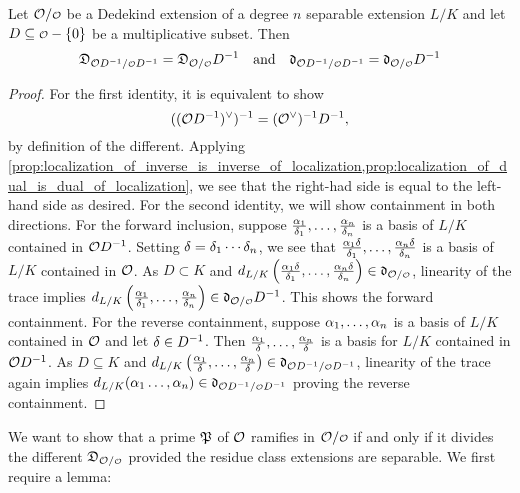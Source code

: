     \begin{proposition}\label{prop:different_and_discriminant_respect_localization}
      Let $\mc{O}/\smc{O}$ be a Dedekind extension of a degree $n$ separable extension $L/K$ and let $D \subseteq \smc{O}-\{0\}$ be a multiplicative subset. Then
      \[
        \mf{D}_{\mc{O}D^{-1}/\smc{O}D^{-1}} = \mf{D}_{\mc{O}/\smc{O}}D^{-1} \quad \text{and} \quad \mf{d}_{\mc{O}D^{-1}/\smc{O}D^{-1}} = \mf{d}_{\mc{O}/\smc{O}}D^{-1}
      \]
    \end{proposition}
    \begin{proof}
      For the first identity, it is equivalent to show
      \[
        ((\mathcal{O}D^{-1})^{\vee})^{-1} = (\mathcal{O}^{\vee})^{-1}D^{-1},
      \]
      by definition of the different. Applying \cref{prop:localization_of_inverse_is_inverse_of_localization,prop:localization_of_dual_is_dual_of_localization}, we see that the right-had side is equal to the left-hand side as desired. For the second identity, we will show containment in both directions. For the forward inclusion, suppose $\frac{\alpha_{1}}{\delta_{1}},\ldots,\frac{\alpha_{n}}{\delta_{n}}$ is a basis of $L/K$ contained in $\mathcal{O}D^{-1}$. Setting $\delta = \delta_{1} \cdots \delta_{n}$, we see that $\frac{\alpha_{1}\delta}{\delta_{1}},\ldots,\frac{\alpha_{n}\delta}{\delta_{n}}$ is a basis of $L/K$ contained in $\mathcal{O}$. As $D \subset K$ and $d_{L/K}\left(\frac{\a_{1}\d}{\d_{1}},\ldots,\frac{\a_{n}\d}{\d_{n}}\right) \in \mf{d}_{\mc{O}/\smc{O}}$, linearity of the trace implies $d_{L/K}\left(\frac{\a_{1}}{\d_{1}},\ldots,\frac{\a_{n}}{\d_{n}}\right) \in \mf{d}_{\mc{O}/\smc{O}}D^{-1}$. This shows the forward containment. For the reverse containment, suppose $\alpha_{1},\ldots,\alpha_{n}$ is a basis of $L/K$ contained in $\mathcal{O}$ and let $\delta \in D^{-1}$. Then $\frac{\alpha_{1}}{\delta},\ldots,\frac{\alpha_{n}}{\delta}$ is a basis for $L/K$ contained in $\mathcal{O}D^{-1}$. As $D \subseteq K$ and $d_{L/K}\left(\frac{\a_{1}}{\d},\ldots,\frac{\a_{n}}{\d}\right) \in \mf{d}_{\mc{O}D^{-1}/\smc{O}D^{-1}}$, linearity of the trace again implies $d_{L/K}(\a_{1}\ldots,\a_{n}) \in \mf{d}_{\mc{O}D^{-1}/\smc{O}D^{-1}}$ proving the reverse containment.
    \end{proof}

    We want to show that a prime $\mathfrak{P}$ of $\mathcal{O}$ ramifies in $\mc{O}/\smc{O}$ if and only if it divides the different $\mf{D}_{\mc{O}/\smc{O}}$ provided the residue class extensions are separable. We first require a lemma:

